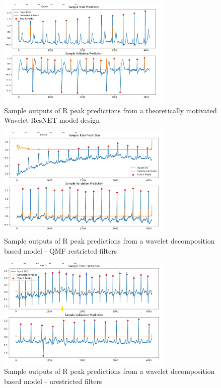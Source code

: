 \documentclass[9pt,conference]{IEEEtran}
\begin{document}
\begin{figure}[H]
\centering\includegraphics[width = 0.75\textwidth]{waveletFullPred.png}
\caption{\label{fig:waveNetPreds} Sample outputs of R peak predictions from a theoretically motivated Wavelet-ResNET model design}
\end{figure}

\begin{figure}[H]
\centering\includegraphics[width = 0.75\textwidth]{qmfPreds.png}
\caption{\label{fig:qmfPreds} Sample outputs of R peak predictions from a wavelet decomposition based model - QMF restricted filters}
\end{figure}

\begin{figure}[H]
\centering\includegraphics[width = 0.75\textwidth]{indWavelet.png}
\caption{\label{fig:indPreds}  Sample outputs of R peak predictions from a wavelet decomposition based model - urestricted filters}
\end{figure}
\end{document}
